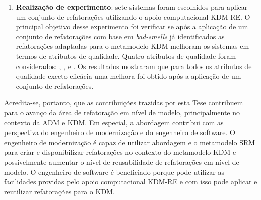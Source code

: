 \begin{enumerate}
\item \textbf{Realização de experimento}: sete sistemas foram escolhidos para aplicar um conjunto de refatorações utilizando o apoio computacional KDM-RE. O principal objetivo desse experimento foi verificar se após a aplicação de um conjunto de refatorações com base em \textit{bad-smells} já identificados as refatorações adaptadas para o metamodelo KDM melhoram os sistemas em termos de atributos de qualidade. Quatro atributos de qualidade foram considerados: , ,  e . Os resultados mostraram que para todos os atributos de qualidade exceto eficácia uma melhora foi obtido após a aplicação de um conjunto de refatorações.

\end{enumerate}

Acredita-se, portanto, que as contribuições trazidas por esta Tese contribuem para o avanço da área de refatoração em nível de modelo, principalmente no contexto da ADM e KDM. Em especial, a abordagem contribui com as perspectiva do engenheiro de modernização e do engenheiro de software. O engenheiro de modernização é capaz de utilizar abordagem e o metamodelo SRM para criar e disponibilizar refatorações no contexto do metamodelo KDM e possivelmente aumentar o nível de reusabilidade de refatorações em nível de modelo. O engenheiro de software é beneficiado porque pode utilizar as facilidades providas pelo apoio computacional KDM-RE e com isso pode aplicar e reutilizar refatorações para o KDM.





